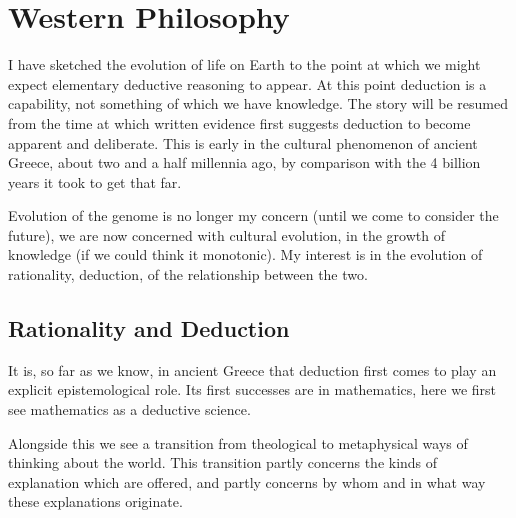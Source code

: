 
\part{Western Philosophy}\label{partII}

I have sketched the evolution of life on Earth to the point at which we might expect elementary deductive reasoning to appear.
At this point deduction is a capability, not something of which we have knowledge.
The story will be resumed from the time at which written evidence first suggests deduction to become apparent and deliberate.
This is early in the cultural phenomenon of ancient Greece, about two and a half millennia ago, by comparison with the 4 billion years it took to get that far.

Evolution of the genome is no longer my concern (until we come to consider the future), we are now concerned with cultural evolution, in the growth of knowledge (if we could think it monotonic).
My interest is in the evolution of rationality, deduction, of the relationship between the two.

\chapter{Rationality and Deduction}

It is, so far as we know, in ancient Greece that deduction first comes to play an explicit epistemological role.
Its first successes are in mathematics, here we first see mathematics as a deductive science.

Alongside this we see a transition from theological to metaphysical ways of thinking about the world.
This transition partly concerns the kinds of explanation which are offered, and partly concerns by whom and in what way these explanations originate.
